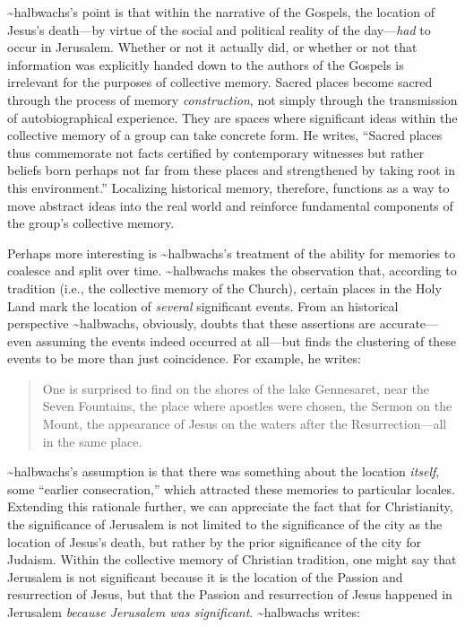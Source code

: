 \textasciitilde{}halbwachs's point is that within the narrative of the
Gospels, the location of Jesus's death---by virtue of the social and
political reality of the day---\emph{had} to occur in
Jerusalem.\autocite[211]{halbwachs1992} Whether or not it actually did,
or whether or not that information was explicitly handed down to the
authors of the Gospels is irrelevant for the purposes of collective
memory. Sacred places become sacred through the process of memory
\emph{construction}, not simply through the transmission of
autobiographical experience. They are spaces where significant ideas
within the collective memory of a group can take concrete form. He
writes, ``Sacred places thus commemorate not facts certified by
contemporary witnesses but rather beliefs born perhaps not far from
these places and strengthened by taking root in this
environment.''\autocite[199]{halbwachs1992} Localizing historical
memory, therefore, functions as a way to move abstract ideas into the
real world and reinforce fundamental components of the group's
collective memory.

Perhaps more interesting is \textasciitilde{}halbwachs's treatment of
the ability for memories to coalesce and split over time.
\textasciitilde{}halbwachs makes the observation that, according to
tradition (i.e., the collective memory of the Church), certain places in
the Holy Land mark the location of \emph{several} significant events.
From an historical perspective \textasciitilde{}halbwachs, obviously,
doubts that these assertions are accurate---even assuming the events
indeed occurred at all---but finds the clustering of these events to be
more than just coincidence. For example, he writes:

\begin{quote}
One is surprised to find on the shores of the lake Gennesaret, near the
Seven Fountains, the place where apostles were chosen, the Sermon on the
Mount, the appearance of Jesus on the waters after the
Resurrection---all in the same place.\autocite[220]{halbwachs1992}
\end{quote}

\textasciitilde{}halbwachs's assumption is that there was something
about the location \emph{itself}, some ``earlier
consecration,''\autocite[220]{halbwachs1992} which attracted these
memories to particular locales. Extending this rationale further, we can
appreciate the fact that for Christianity, the significance of Jerusalem
is not limited to the significance of the city as the location of
Jesus's death, but rather by the prior significance of the city for
Judaism. Within the collective memory of Christian tradition, one might
say that Jerusalem is not significant because it is the location of the
Passion and resurrection of Jesus, but that the Passion and resurrection
of Jesus happened in Jerusalem \emph{because Jerusalem was significant}.
\textasciitilde{}halbwachs writes:

